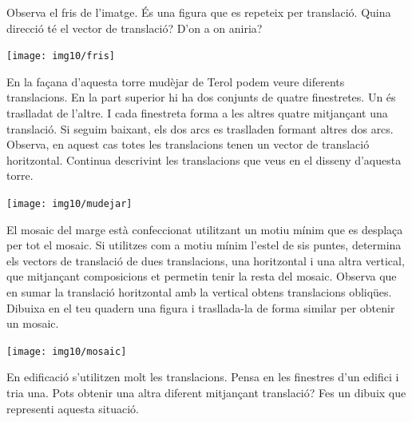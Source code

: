 \begin{mylist}
	
	\vspace{-1.5cm}
	\exer \begin{minipage}[t]{0.5\textwidth}
		Observa el fris de l'imatge. És una figura que es repeteix per translació. Quina direcció té el vector de translació? D'on a on aniria?
	\end{minipage}
	\begin{minipage}{0.5\textwidth}
		\centering
		\vspace{1.5cm}
		\texttt{[image: img10/fris]}
	\end{minipage}
	
	\vspace{-4.5cm}
	\exer \begin{minipage}[t]{0.55\textwidth}
		En la façana d'aquesta torre mudèjar de Terol podem veure diferents translacions. En la part superior hi ha dos conjunts de quatre finestretes. Un és traslladat de l'altre. I cada finestreta forma a les altres quatre mitjançant una translació. Si seguim baixant, els dos arcs es traslladen formant altres dos arcs. Observa, en aquest cas totes les translacions tenen un vector de translació horitzontal. Continua descrivint les translacions que veus en el disseny d'aquesta torre.
	\end{minipage}
	\begin{minipage}{0.45\textwidth}
		\centering
		\vspace{4.5cm}
		\texttt{[image: img10/mudejar]}
	\end{minipage}

	\vspace{-2.5cm}
	\exer \begin{minipage}[t]{0.7\textwidth}
		El mosaic del marge està confeccionat utilitzant un motiu mínim que es desplaça per tot el mosaic. Si utilitzes com a motiu mínim l'estel de sis puntes,  determina els vectors de translació de dues translacions, una horitzontal i una altra vertical, que mitjançant composicions et permetin tenir la resta del mosaic. Observa que en sumar la translació horitzontal amb la vertical obtens translacions obliqües. Dibuixa en el teu quadern una figura i trasllada-la de forma similar per obtenir un mosaic.
	\end{minipage}
	\begin{minipage}{0.24\textwidth}
		\centering
		\vspace{2.5cm}
		\texttt{[image: img10/mosaic]}
	\end{minipage}
	
	
	
	\exer  En edificació s'utilitzen molt les translacions. Pensa en les finestres d'un edifici i tria una. Pots obtenir una altra diferent mitjançant translació? Fes un dibuix que representi aquesta situació.
	
	
	
	
\end{mylist}


